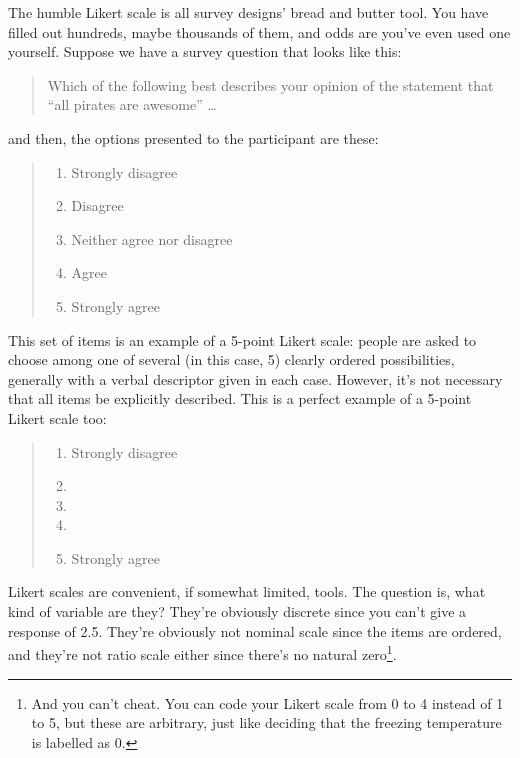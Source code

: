 \documentclass[
  11pt,
]{book}
\providecommand{\tightlist}{%
  \setlength{\itemsep}{0pt}\setlength{\parskip}{0pt}}
\theoremstyle{indenteddefinition}
\theoremstyle{indenteddefinition}
\theoremstyle{definition}
\theoremstyle{definition}
\theoremstyle{remark}
\begin{document}
The humble Likert scale is all survey designs' bread and butter tool. You have filled out hundreds, maybe thousands of them, and odds are you've even used one yourself. Suppose we have a survey question that looks like this:

\begin{quote}
Which of the following best describes your opinion of the statement that ``all pirates are awesome'' \ldots{}
\end{quote}

and then, the options presented to the participant are these:

\begin{quote}
\begin{enumerate}
\def\labelenumi{(\arabic{enumi})}
\tightlist
\item
  Strongly disagree
\item
  Disagree
\item
  Neither agree nor disagree
\item
  Agree
\item
  Strongly agree
\end{enumerate}
\end{quote}

This set of items is an example of a 5-point Likert scale: people are asked to choose among one of several (in this case, 5) clearly ordered possibilities, generally with a verbal descriptor given in each case. However, it's not necessary that all items be explicitly described. This is a perfect example of a 5-point Likert scale too:

\begin{quote}
\begin{enumerate}
\def\labelenumi{(\arabic{enumi})}
\tightlist
\item
  Strongly disagree
\item
\item
\item
\item
  Strongly agree
\end{enumerate}
\end{quote}

Likert scales are convenient, if somewhat limited, tools. The question is, what kind of variable are they? They're obviously discrete since you can't give a response of 2.5. They're obviously not nominal scale since the items are ordered, and they're not ratio scale either since there's no natural zero\footnote{And you can't cheat. You can code your Likert scale from 0 to 4 instead of 1 to 5, but these are arbitrary, just like deciding that the freezing temperature is labelled as 0.}.
\end{document}
